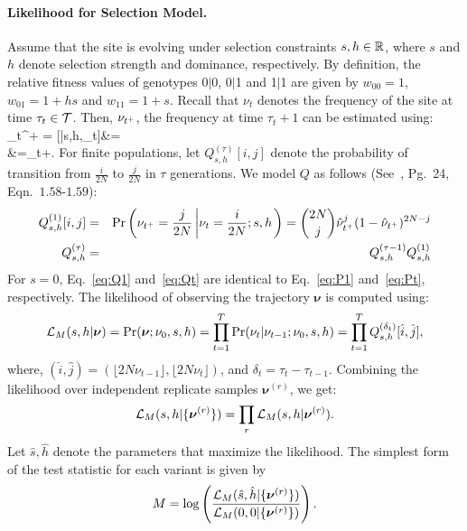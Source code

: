 \documentclass[11pt]{article}
\begin{document}
\paragraph{Likelihood for Selection Model.}
Assume that the site is evolving under selection constraints $s,h\in
{\mathbb R}$, where $s$ and $h$ denote selection strength and dominance,
respectively. By definition, the relative fitness values of genotypes
0$|$0, 0$|$1 and 1$|$1 are given by $w_{00}=1$, $w_{01}=1+hs$ and
$w_{11}=1+s$. Recall that $\nu_t$ denotes the frequency of the site at
time $\tau_t\in {\cal T}$. Then, $\nu_{t^+}$, the frequency at time
$\tau_t+1$ can be estimated using: \beq \hat{\nu}_{t^+} =
[\nusp|s,h,\nu_t]&=\\
&=\nu_t+.
  \label{eq:transition}
\eeq
For finite populations, let $Q^{(\tau)}_{s,h}[i,j]$ denote the
probability of transition from $\frac{i}{2N}$ to $\frac{j}{2N}$ in
$\tau$ generations. We model $Q$ as follows
(See~\cite{Ewens2012Mathematical}, Pg.~24, Eqn.~$1.58$-$1.59$):
\begin{eqnarray}
  Q^{(1)}_{s,h}[i,j] &=& \operatorname{Pr}\left(\nu_{t^+}=\frac{j}{2N} \left\lvert
      \nu_{t}=\frac{i}{2N};s,h \right .\right)={2N \choose j}
  \hat{\nu}_{t^+}^{j} (1-\hat{\nu}_{t^+})^{2N-j}\label{eq:Q1}\\
  Q^{(\tau)}_{s,h} &=& Q^{(\tau-1)}_{s,h}Q^{(1)}_{s,h}\label{eq:Qt}
  \label{eq:mkvs}   
\end{eqnarray}
For $s=0$, Eq.~\ref{eq:Q1} and~\ref{eq:Qt} are identical to
Eq.~\ref{eq:P1} and~\ref{eq:Pt}, respectively.  The likelihood of
observing the trajectory $\bm{\nu}$ is computed using:
\begin{equation}
  {\cal L}_M(s,h|\bm{\nu}) = \operatorname{Pr}(\bm{\nu};\nu_0,s,h)=
  \prod_{t=1}^{T} \operatorname{Pr}(\nu_{t}|\nu_{t-1};\nu_0,s,h) = \prod_{t=1}^{T} Q^{(\delta_t)}_{s,h}[\hat{i},\hat{j}],
\end{equation}
where, $(\hat{i},\hat{j})=(\lfloor 2N\nu_{t-1}\rfloor, \lfloor
2N\nu_{t}\rfloor)$, and $\delta_t=\tau_{t}-\tau_{t-1}$. Combining the
likelihood over independent replicate samples $\bm{\nu}^{(r)}$, we
get:
\begin{equation}
  {\cal L}_M(s,h|\{\bm{\nu}^{(r)}\}) = \prod_r   {\cal L}_M(s,h|\bm{\nu}^{(r)}).
  \label{eq:mkvlik}
\end{equation}
Let $\hat{s},\hat{h}$ denote the parameters that maximize the likelihood. The
simplest form of the test statistic for each variant is given by
\begin{eqnarray}
M= \log 
\left(\frac{{\cal L}_M(\hat{s},\hat{h}|\{\bm{\nu}^{(r)}\})}{{\cal L}_M(0,0|\{\bm{\nu}^{(r)}\})}\right).
\label{eq:mcts}
\end{eqnarray}
\end{document}
